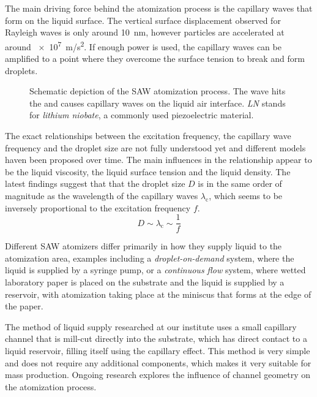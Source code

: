 The main driving force behind the atomization process is the capillary waves that form on the liquid surface.
The vertical surface displacement observed for Rayleigh waves is only around \SI{10}{\nano\meter}, however particles are accelerated at around \SI{e7}{\meter/\second\squared}.
If enough power is used, the capillary waves can be amplified to a point where they overcome the surface tension to break and form droplets.

\begin{figure}[htbp]
    \centering
    \caption{Schematic depiction of the SAW atomization process. The wave hits the and causes capillary waves on the liquid air interface. \emph{LN} stands for \emph{lithium niobate}, a commonly used piezoelectric material. \cite{aishaqiInvestigationSAWAtomization2009}}
    \label{fig:atomization}
\end{figure}

The exact relationships between the excitation frequency, the capillary wave frequency and the droplet size are not fully understood yet and different models haven been proposed over time.
The main influences in the relationship appear to be the liquid viscosity, the liquid surface tension and the liquid density. \cite{aishaqiInvestigationSAWAtomization2009,huangExperimentalResearchSurface2022}
The latest findings suggest that that the droplet size $D$ is in the same order of magnitude as the wavelength of the capillary waves $\lambda_\text{c}$, which seems to be inversely proportional to the excitation frequency $f$. \cite{collinsAtomizationThinWater2012}
$$
    D \sim \lambda_\text{c} \sim \frac{1}{f}
$$

Different SAW atomizers differ primarily in how they supply liquid to the atomization area, examples including a \emph{droplet-on-demand} system, where the liquid is supplied by a syringe pump, or a \emph{continuous flow} system, where wetted laboratory paper is placed  on the substrate and the liquid is supplied by a reservoir, with atomization taking place at the miniscus that forms at the edge of the paper. \cite{winklerSAWbasedFluidAtomization2015a}

The method of liquid supply researched at our institute uses a small capillary channel that is mill-cut directly into the substrate, which has direct contact to a liquid reservoir, filling itself using the capillary effect.
This method is very simple and does not require any additional components, which makes it very suitable for mass production.
Ongoing research explores the influence of channel geometry on the atomization process. \cite{kapplAkustischInduzierteVernebelung2022}

